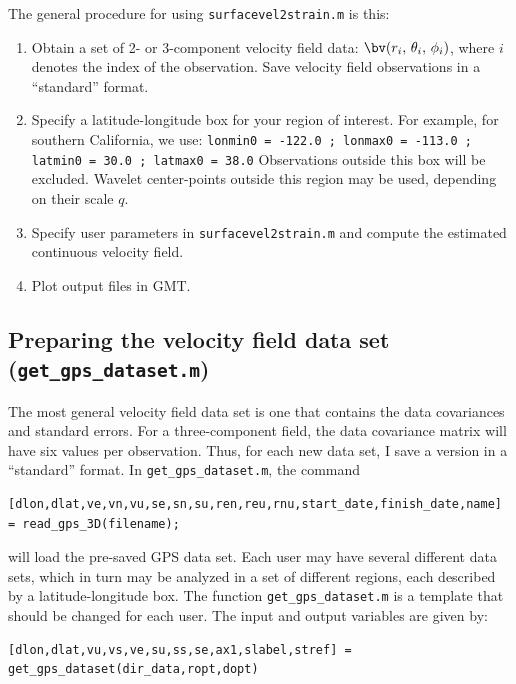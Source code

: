 \documentclass[11pt,titlepage,fleqn]{article}
\begin{document}
The general procedure for using \verb+surfacevel2strain.m+ is this:
%
\begin{enumerate}
\item Obtain a set of 2- or 3-component velocity field data: $\bv(r_i,\,\theta_i,\,\phi_i)$, where $i$ denotes the index of the observation. Save velocity field observations in a ``standard'' format.

\item Specify a latitude-longitude box for your region of interest. For example, for southern California, we use:
%
\verb+lonmin0 = -122.0 ; lonmax0 = -113.0 ; latmin0 = 30.0 ; latmax0 = 38.0+
%
Observations outside this box will be excluded. Wavelet center-points outside this region may be used, depending on their scale $q$.

\item Specify user parameters in \verb+surfacevel2strain.m+ and compute the estimated continuous velocity field.

\item Plot output files in GMT.
\end{enumerate}


\subsection{Preparing the velocity field data set ({\tt get\_gps\_dataset.m})}

The most general velocity field data set is one that contains the data covariances and standard errors.  For a three-component field, the data covariance matrix will have six values per observation.  Thus, for each new data set, I save a version in a ``standard'' format.
In \verb+get_gps_dataset.m+, the command
%
\begin{verbatim}
[dlon,dlat,ve,vn,vu,se,sn,su,ren,reu,rnu,start_date,finish_date,name] = read_gps_3D(filename);
\end{verbatim}
%
will load the pre-saved GPS data set. Each user may have several different data sets, which in turn may be analyzed in a set of different regions, each described by a latitude-longitude box. The function \verb+get_gps_dataset.m+ is a template that should be changed for each user. The input and output variables are given by:
%
\begin{verbatim}
[dlon,dlat,vu,vs,ve,su,ss,se,ax1,slabel,stref] = get_gps_dataset(dir_data,ropt,dopt)
\end{verbatim}
\end{document}
